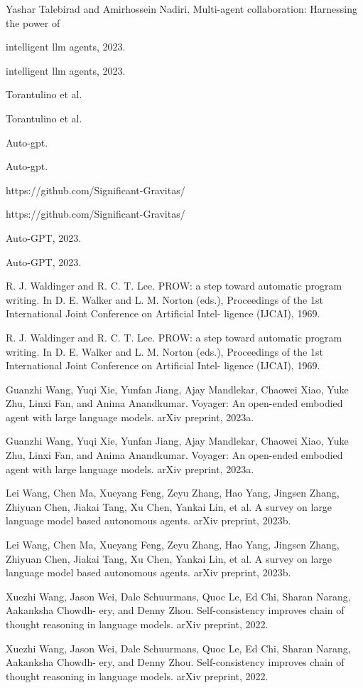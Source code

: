 \documentclass[12pt]{article}
\begin{document}
Yashar Talebirad and Amirhossein Nadiri. Multi-agent collaboration: Harnessing the power of


intelligent llm agents, 2023.


intelligent llm agents, 2023.


Torantulino et al.


Torantulino et al.


Auto-gpt.


Auto-gpt.


https://github.com/Significant-Gravitas/


https://github.com/Significant-Gravitas/


Auto-GPT, 2023.


Auto-GPT, 2023.


R. J. Waldinger and R. C. T. Lee. PROW: a step toward automatic program writing. In D. E. Walker
and L. M. Norton (eds.), Proceedings of the 1st International Joint Conference on Artificial Intel-
ligence (IJCAI), 1969.


R. J. Waldinger and R. C. T. Lee. PROW: a step toward automatic program writing. In D. E. Walker
and L. M. Norton (eds.), Proceedings of the 1st International Joint Conference on Artificial Intel-
ligence (IJCAI), 1969.


Guanzhi Wang, Yuqi Xie, Yunfan Jiang, Ajay Mandlekar, Chaowei Xiao, Yuke Zhu, Linxi Fan,
and Anima Anandkumar. Voyager: An open-ended embodied agent with large language models.
arXiv preprint, 2023a.


Guanzhi Wang, Yuqi Xie, Yunfan Jiang, Ajay Mandlekar, Chaowei Xiao, Yuke Zhu, Linxi Fan,
and Anima Anandkumar. Voyager: An open-ended embodied agent with large language models.
arXiv preprint, 2023a.


Lei Wang, Chen Ma, Xueyang Feng, Zeyu Zhang, Hao Yang, Jingsen Zhang, Zhiyuan Chen, Jiakai
Tang, Xu Chen, Yankai Lin, et al. A survey on large language model based autonomous agents.
arXiv preprint, 2023b.


Lei Wang, Chen Ma, Xueyang Feng, Zeyu Zhang, Hao Yang, Jingsen Zhang, Zhiyuan Chen, Jiakai
Tang, Xu Chen, Yankai Lin, et al. A survey on large language model based autonomous agents.
arXiv preprint, 2023b.


Xuezhi Wang, Jason Wei, Dale Schuurmans, Quoc Le, Ed Chi, Sharan Narang, Aakanksha Chowdh-
ery, and Denny Zhou. Self-consistency improves chain of thought reasoning in language models.
arXiv preprint, 2022.


Xuezhi Wang, Jason Wei, Dale Schuurmans, Quoc Le, Ed Chi, Sharan Narang, Aakanksha Chowdh-
ery, and Denny Zhou. Self-consistency improves chain of thought reasoning in language models.
arXiv preprint, 2022.
\end{document}
